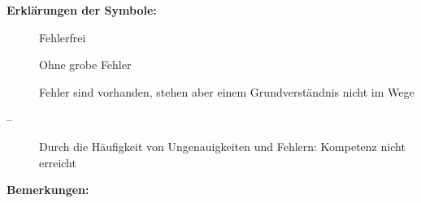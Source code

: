 {		\begin{minipage}{0.36\textwidth}
			\footnotesize
			\textbf{Erklärungen der Symbole:}
			\begin{description}
				\item[] Fehlerfrei
				\item[] Ohne grobe Fehler
				\item[] Fehler sind vorhanden, stehen aber einem Grundverständnis nicht im Wege
				\item[--] Durch die Häufigkeit von Ungenauigkeiten und Fehlern: Kompetenz nicht erreicht
			\end{description}
		\end{minipage}
		\begin{minipage}{0.63\textwidth}
			\textbf{Bemerkungen:}
			\vspace{10em}
		\end{minipage}

		
	\renewcommand{\arraystretch}{1}
	\clearpage
}
